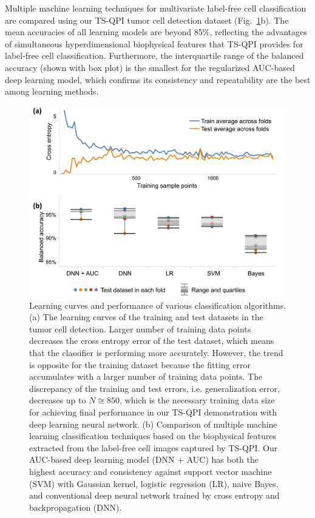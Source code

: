 \documentclass[aps,pra,reprint,superscriptaddress]{revtex4-1}
\begin{document}
Multiple machine learning techniques for multivariate label-free cell classification are compared using our TS-QPI tumor cell detection dataset (Fig.~\ref{fig:LearningCurve}b). The mean accuracies of all learning models are beyond 85\%, reflecting the advantages of simultaneous hyperdimensional biophysical features that TS-QPI provides for label-free cell classification. Furthermore, the interquartile range of the balanced accuracy (shown with box plot) is the smallest for the regularized AUC-based deep learning model, which confirms its consistency and repeatability are the best among learning methods.

\begin{figure}
\includegraphics[scale=0.08]{FigureLearningCurve.jpg}
\caption{\label{fig:LearningCurve} Learning curves and performance of various classification algorithms. (a) The learning curves of the training and test datasets in the tumor cell detection. Larger number of training data points decreases the cross entropy error of the test dataset, which means that the classifier is performing more accurately. However, the trend is opposite for the training dataset because the fitting error accumulates with a larger number of training data points. The discrepancy of the training and test errors, i.e. generalization error, decreases up to $N \cong 850$, which is the necessary training data size for achieving final performance in our TS-QPI demonstration with deep learning neural network. (b) Comparison of multiple machine learning classification techniques based on the biophysical features extracted from the label-free cell images captured by TS-QPI. Our AUC-based deep learning model (DNN + AUC) has both the highest accuracy and consistency against support vector machine (SVM) with Gaussian kernel, logistic regression (LR), naive Bayes, and conventional deep neural network trained by cross entropy and backpropagation (DNN).}
\end{figure}
\end{document}
